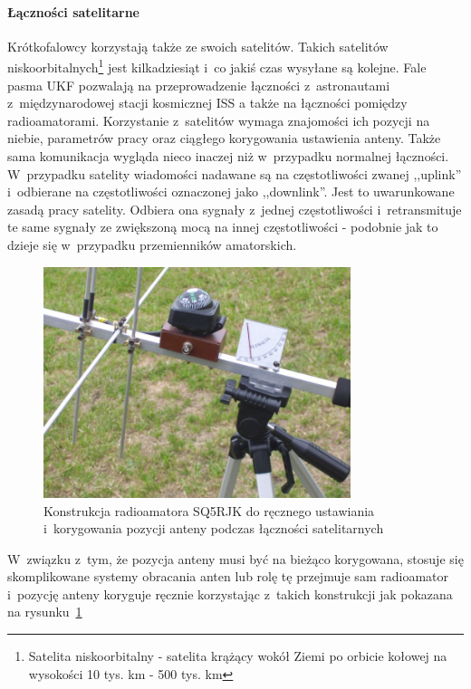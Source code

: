 \documentclass[eng,oneside]{mgr}
\begin{document}
					\paragraph{Łączności satelitarne}
					Krótkofalowcy korzystają także ze swoich satelitów. Takich satelitów niskoorbitalnych\footnote{Satelita niskoorbitalny - satelita krążący wokół Ziemi po orbicie kołowej na wysokości 10 tys. km - 500 tys. km} jest kilkadziesiąt i~co jakiś czas wysyłane są kolejne. Fale pasma UKF pozwalają na przeprowadzenie łączności z~astronautami z~międzynarodowej stacji kosmicznej ISS a także na łączności pomiędzy radioamatorami. Korzystanie z~satelitów wymaga znajomości ich pozycji na niebie, parametrów pracy oraz ciągłego korygowania ustawienia anteny. Także sama komunikacja wygląda nieco inaczej niż w~przypadku normalnej łączności. W~przypadku satelity wiadomości nadawane są na częstotliwości zwanej ,,uplink'' i~odbierane na częstotliwości oznaczonej jako ,,downlink''. Jest to uwarunkowane zasadą pracy satelity. Odbiera ona sygnały z~jednej częstotliwości i~retransmituje te same sygnały ze zwiększoną mocą na innej częstotliwości - podobnie jak to dzieje się w~przypadku przemienników amatorskich.
					\begin{figure}[!htb]
						\begin{center}
							\includegraphics[width=0.8\textwidth]{example_sat_construction}
						\end{center}
						\caption{Konstrukcja radioamatora SQ5RJK do ręcznego ustawiania i~korygowania pozycji anteny podczas łączności satelitarnych}
						\label{fig:example_sat_construction}
					\end{figure}
					W~związku z~tym, że pozycja anteny musi być na bieżąco korygowana, stosuje się skomplikowane systemy obracania anten lub rolę tę przejmuje sam radioamator i~pozycję anteny koryguje ręcznie korzystając z~takich konstrukcji jak pokazana na rysunku~\ref{fig:example_sat_construction}
\end{document}
